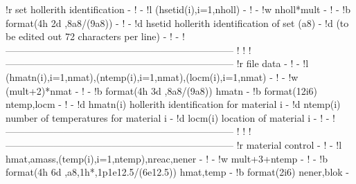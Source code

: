 \begin{ccode}
!r           set hollerith identification                              -
!                                                                      -
!l    (hsetid(i),i=1,nholl)                                            -
!                                                                      -
!w    nholl*mult                                                       -
!                                                                      -
!b    format(4h 2d ,8a8/(9a8))                                         -
!                                                                      -
!d    hsetid      hollerith identification of set (a8)                 -
!d                 (to be edited out 72 characters per line)           -
!                                                                      -
!-----------------------------------------------------------------------
!
!
!-----------------------------------------------------------------------
!r          file data                                                  -
!                                                                      -
!l    (hmatn(i),i=1,nmat),(ntemp(i),i=1,nmat),(locm(i),i=1,nmat)       -
!                                                                      -
!w    (mult+2)*nmat                                                    -
!                                                                      -
!b    format(4h 3d ,8a8/(9a8))      hmatn                              -
!b    format(12i6)                  ntemp,locm                         -
!                                                                      -
!d    hmatn(i)    hollerith identification for material i              -
!d    ntemp(i)    number of temperatures for material i                -
!d    locm(i)     location of material i                               -
!                                                                      -
!-----------------------------------------------------------------------
!
!
!-----------------------------------------------------------------------
!r          material control                                           -
!                                                                      -
!l    hmat,amass,(temp(i),i=1,ntemp),nreac,nener                       -
!                                                                      -
!w    mult+3+ntemp                                                     -
!                                                                      -
!b    format(4h 6d ,a8,1h*,1p1e12.5/(6e12.5))     hmat,temp            -
!b    format(2i6)                                 nener,blok           -

\end{ccode}
